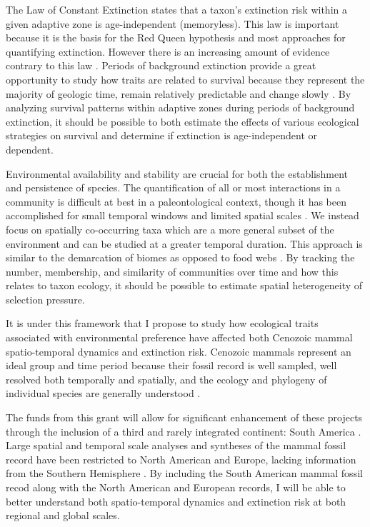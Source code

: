 \documentclass[11pt,letterpaper]{article}
\begin{document}
The Law of Constant Extinction \citep{VanValen1973} states that a taxon's extinction risk within a given adaptive zone is age-independent (memoryless). This law is important because it is the basis for the Red Queen hypothesis and most approaches for quantifying extinction. However there is an increasing amount of evidence contrary to this law \citep{Drake2014,Raup1975,Sepkoski1975,Finnegan2008}. Periods of background extinction provide a great opportunity to study how traits are related to survival because they represent the majority of geologic time, remain relatively predictable and change slowly \citep{Jablonski1986,Raup1988}. By analyzing survival patterns within adaptive zones during periods of background extinction, it should be possible to both estimate the effects of various ecological strategies on survival and determine if extinction is age-independent or dependent.

Environmental availability and stability are crucial for both the establishment and persistence of species. The quantification of all or most interactions in a community is difficult at best in a paleontological context, though it has been accomplished for small temporal windows and limited spatial scales \citep{Angielczyk2005,Mitchell2012,Roopnarine2007}. We instead focus on spatially co-occurring taxa which are a more general subset of the environment and can be studied at a greater temporal duration. This approach is similar to the demarcation of biomes as opposed to food webs \citep{Vilhena2013b}. By tracking the number, membership, and similarity of communities over time and how this relates to taxon ecology, it should be possible to estimate spatial heterogeneity of selection pressure.

It is under this framework that I propose to study how ecological traits associated with environmental preference have affected both Cenozoic mammal spatio-temporal dynamics and extinction risk. Cenozoic mammals represent an ideal group and time period because their fossil record is well sampled, well resolved both temporally and spatially, and the ecology and phylogeny of individual species are generally understood \citep{Alroy2009,Alroy2000g,Jernvall2002,Liow2008,Smith2004}. 

The funds from this grant will allow for significant enhancement of these projects through the inclusion of a third and rarely integrated continent: South America \citep{Stromberg2013,Marshall1982}. Large spatial and temporal scale analyses and syntheses of the mammal fossil record have been restricted to North American and Europe, lacking information from the Southern Hemisphere \citep{Jernvall2004,Jernvall2002,Fortelius2002,Janis2000,Alroy1996a,Alroy1998,Alroy2000g,Liow2008,Raia2006,Tomiya2013}. By including the South American mammal fossil recod along with the North American and European records, I will be able to better understand both spatio-temporal dynamics and extinction risk at both regional and global scales. 
\end{document}
